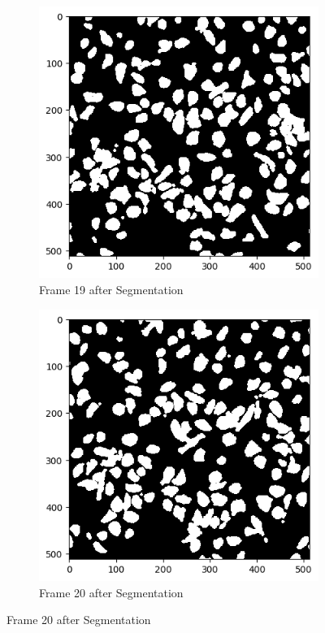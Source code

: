 \documentclass{article}
\begin{document}
\begin{figure}[h!]
  \centering
  \begin{subfigure}{0.4\textwidth}
    \includegraphics[width=\linewidth]{Report/Appendix_Images/Segmentation-B-Growth/frame_19.png}
    \caption*{Frame 19 after Segmentation}
  \end{subfigure}
  \hfill
  \begin{subfigure}{0.4\textwidth}
    \includegraphics[width=\linewidth]{Report/Appendix_Images/Segmentation-B-Growth/frame_20.png}
    \caption*{Frame 20 after Segmentation}
  \end{subfigure}


\end{figure}
\end{document}
